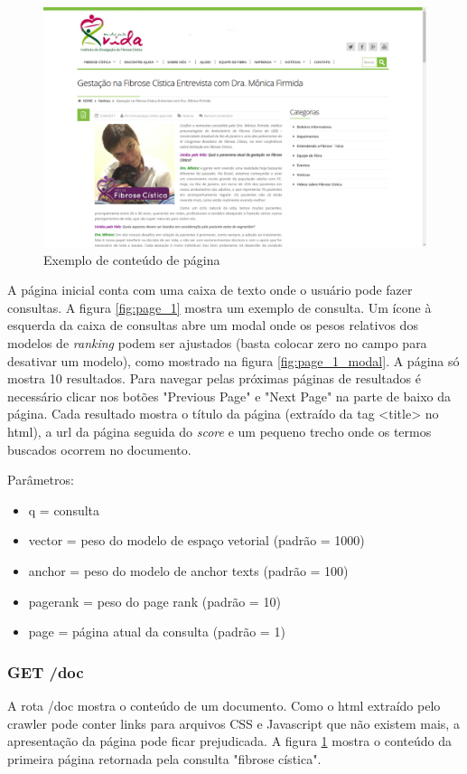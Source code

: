 \documentclass{article}
\begin{document}
\begin{figure}
\centering
\includegraphics[width=\linewidth]{doc.png}
\caption{Exemplo de conteúdo de página} 
\label{fig:doc}
\end{figure}

A página inicial conta com uma caixa de texto onde o usuário pode fazer consultas. A figura \ref{fig:page_1}
mostra um exemplo de consulta. 
Um ícone à esquerda da caixa de consultas abre um modal onde os pesos relativos dos modelos de \textit{ranking}
podem ser ajustados (basta colocar zero no campo para desativar um modelo), como mostrado na figura
\ref{fig:page_1_modal}. A página só mostra 
10 resultados. Para navegar pelas próximas páginas de resultados é necessário clicar nos botões
"Previous Page" e "Next Page" na parte de baixo da página.
Cada resultado mostra o título da página (extraído da tag <title> no html), a url da página 
seguida do \textit{score} e um pequeno trecho onde os termos buscados
ocorrem no documento.

Parâmetros: 
\begin{itemize}
  \item q = consulta
  \item vector = peso do modelo de espaço vetorial (padrão = 1000)
  \item anchor = peso do modelo de anchor texts (padrão = 100)
  \item pagerank = peso do page rank (padrão = 10)
  \item page = página atual da consulta (padrão = 1)
\end{itemize}

\subsubsection{GET /doc}
A rota /doc mostra o conteúdo de um documento. Como o html extraído pelo crawler pode conter links para
arquivos CSS e Javascript que não existem mais, a apresentação da página pode ficar prejudicada. A 
figura \ref{fig:doc} mostra o conteúdo da primeira página retornada pela consulta "fibrose cística". 
\end{document}
